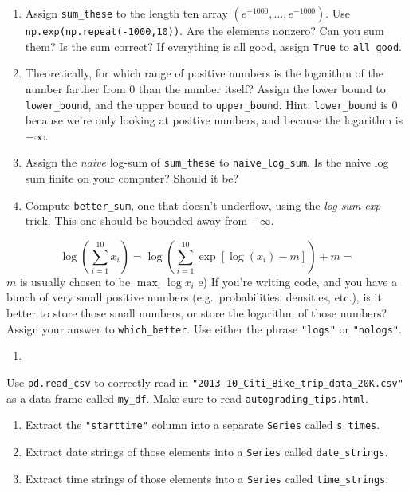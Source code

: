 \documentclass[
  12pt,
  krantz2]{krantz}
\providecommand{\tightlist}{%
  \setlength{\itemsep}{0pt}\setlength{\parskip}{0pt}}
\begin{document}
\begin{enumerate}
\def\labelenumi{\alph{enumi})}
\tightlist
\item
  Assign \texttt{sum\_these} to the length ten array \((e^{-1000}, \ldots, e^{-1000})\). Use \texttt{np.exp(np.repeat(-1000,10))}. Are the elements nonzero? Can you sum them? Is the sum correct? If everything is all good, assign \texttt{True} to \texttt{all\_good}.
\item
  Theoretically, for which range of positive numbers is the logarithm of the number farther from \(0\) than the number itself? Assign the lower bound to \texttt{lower\_bound}, and the upper bound to \texttt{upper\_bound}. Hint: \texttt{lower\_bound} is \(0\) because we're only looking at positive numbers, and because the logarithm is \(-\infty\).
\item
  Assign the \emph{naive} log-sum of \texttt{sum\_these} to \texttt{naive\_log\_sum}. Is the naive log sum finite on your computer? Should it be?
\item
  Compute \texttt{better\_sum}, one that doesn't underflow, using the \emph{log-sum-exp} trick. This one should be bounded away from \(-\infty\).
\end{enumerate}

\[
  \log\left( \sum_{i=1}^{10} x_i \right) = \log\left( \sum_{i=1}^{10} \exp[ \log(x_i) - m] \right) + m = 
  \]
\(m\) is usually chosen to be \(\max_i \log x_i\)
e) If you're writing code, and you have a bunch of very small positive numbers (e.g.~probabilities, densities, etc.), is it better to store those small numbers, or store the logarithm of those numbers? Assign your answer to \texttt{which\_better}. Use either the phrase \texttt{"logs"} or \texttt{"nologs"}.

\begin{enumerate}
\def\labelenumi{\arabic{enumi}.}
\setcounter{enumi}{4}
\tightlist
\item
\end{enumerate}

Use \texttt{pd.read\_csv} to correctly read in \texttt{"2013-10\_Citi\_Bike\_trip\_data\_20K.csv"} as a data frame called \texttt{my\_df}. Make sure to read \texttt{autograding\_tips.html}.

\begin{enumerate}
\def\labelenumi{\alph{enumi})}
\tightlist
\item
  Extract the \texttt{"starttime"} column into a separate \texttt{Series} called \texttt{s\_times}.
\item
  Extract date strings of those elements into a \texttt{Series} called \texttt{date\_strings}.
\item
  Extract time strings of those elements into a \texttt{Series} called \texttt{time\_strings}.
\end{enumerate}
\end{document}
